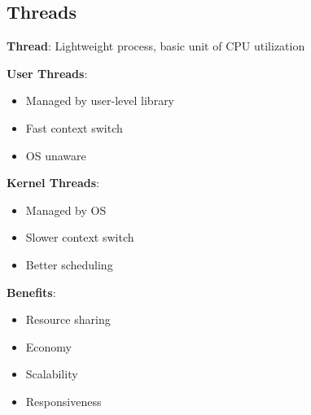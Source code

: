 \documentclass[12pt,a4paper]{report}
\begin{document}
\subsection{Threads}
\begin{concept}
\textbf{Thread}: Lightweight process, basic unit of CPU utilization

\textbf{User Threads}:
\begin{itemize}
    \item Managed by user-level library
    \item Fast context switch
    \item OS unaware
\end{itemize}

\textbf{Kernel Threads}:
\begin{itemize}
    \item Managed by OS
    \item Slower context switch
    \item Better scheduling
\end{itemize}

\textbf{Benefits}:
\begin{itemize}
    \item Resource sharing
    \item Economy
    \item Scalability
    \item Responsiveness
\end{itemize}
\end{concept}
\end{document}
